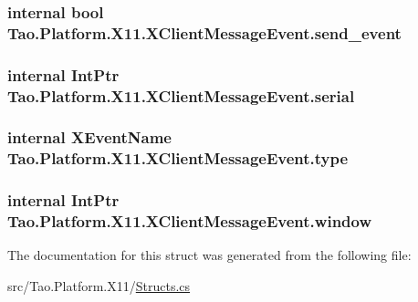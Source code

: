 \label{struct_tao_1_1_platform_1_1_x11_1_1_x_client_message_event_a74fd1ad859294038afe1b823fed668d9}
\hypertarget{struct_tao_1_1_platform_1_1_x11_1_1_x_client_message_event_a2abb0394db805ab8611d5ac98078d92a}{
\subsubsection[{send\_\-event}]{\setlength{\rightskip}{0pt plus 5cm}internal bool {\bf Tao.Platform.X11.XClientMessageEvent.send\_\-event}}}
\label{struct_tao_1_1_platform_1_1_x11_1_1_x_client_message_event_a2abb0394db805ab8611d5ac98078d92a}
\hypertarget{struct_tao_1_1_platform_1_1_x11_1_1_x_client_message_event_a03201dcb36a4c1530ac22f8bcdd5e7f8}{
\subsubsection[{serial}]{\setlength{\rightskip}{0pt plus 5cm}internal IntPtr {\bf Tao.Platform.X11.XClientMessageEvent.serial}}}
\label{struct_tao_1_1_platform_1_1_x11_1_1_x_client_message_event_a03201dcb36a4c1530ac22f8bcdd5e7f8}
\hypertarget{struct_tao_1_1_platform_1_1_x11_1_1_x_client_message_event_ab08d063e2008e7c3e5e417032c3df4f2}{
\subsubsection[{type}]{\setlength{\rightskip}{0pt plus 5cm}internal {\bf XEventName} {\bf Tao.Platform.X11.XClientMessageEvent.type}}}
\label{struct_tao_1_1_platform_1_1_x11_1_1_x_client_message_event_ab08d063e2008e7c3e5e417032c3df4f2}
\hypertarget{struct_tao_1_1_platform_1_1_x11_1_1_x_client_message_event_aadfb6b7ffbc68c8a55f2caa7ce96c9ab}{
\subsubsection[{window}]{\setlength{\rightskip}{0pt plus 5cm}internal IntPtr {\bf Tao.Platform.X11.XClientMessageEvent.window}}}
\label{struct_tao_1_1_platform_1_1_x11_1_1_x_client_message_event_aadfb6b7ffbc68c8a55f2caa7ce96c9ab}


The documentation for this struct was generated from the following file:\begin{DoxyCompactItemize}
\item 
src/Tao.Platform.X11/\hyperlink{_structs_8cs}{Structs.cs}\end{DoxyCompactItemize}
